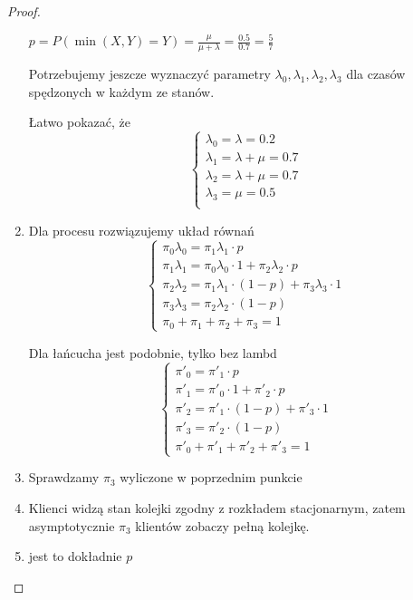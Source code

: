 \begin{proof}
\begin{enumerate}
        \( p = P(\min(X, Y) = Y) = \frac{\mu}{\mu + \lambda} = \frac{0.5}{0.7} = \frac{5}{7} \)
        
        Potrzebujemy jeszcze wyznaczyć parametry \( \lambda_0, \lambda_1, \lambda_2, \lambda_3 \) dla czasów spędzonych w każdym ze stanów.
        
        Łatwo pokazać, że \[
            \begin{cases}
                \lambda_0 = \lambda = 0.2 \\
                \lambda_1 = \lambda + \mu = 0.7 \\
                \lambda_2 = \lambda + \mu = 0.7 \\
                \lambda_3 = \mu = 0.5 \\
            \end{cases}
        \]
        
        \item
            Dla procesu rozwiązujemy układ równań
            \[
                \begin{cases}
                    \pi_0 \lambda_0 = \pi_1 \lambda_1 \cdot p \\
                    \pi_1 \lambda_1 = \pi_0 \lambda_0 \cdot 1 + \pi_2 \lambda_2 \cdot p \\
                    \pi_2 \lambda_2 = \pi_1 \lambda_1 \cdot (1 - p) + \pi_3 \lambda_3 \cdot 1 \\
                    \pi_3 \lambda_3 = \pi_2 \lambda_2 \cdot (1 - p) \\
                    \pi_0 + \pi_1 + \pi_2 + \pi_3 = 1
                \end{cases}
            \]
            
            Dla łańcucha jest podobnie, tylko bez lambd
            \[
                \begin{cases}
                    \pi'_0 = \pi'_1 \cdot p \\
                    \pi'_1 = \pi'_0 \cdot 1 + \pi'_2 \cdot p \\
                    \pi'_2 = \pi'_1 \cdot (1 - p) + \pi'_3 \cdot 1 \\
                    \pi'_3 = \pi'_2 \cdot (1 - p) \\
                    \pi'_0 + \pi'_1 + \pi'_2 + \pi'_3 = 1
                \end{cases}
            \]
            
        \item Sprawdzamy \( \pi_3 \) wyliczone w poprzednim punkcie
        
        \item Klienci widzą stan kolejki zgodny z rozkładem stacjonarnym, zatem asymptotycznie \( \pi_3 \) klientów zobaczy pełną kolejkę. 
        
        \item jest to dokładnie \( p \)
            
    \end{enumerate}
\end{proof}